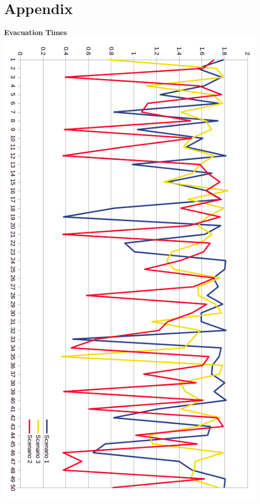 \documentclass[12pt,letterpaper]{article}
\begin{document}
        \section{Appendix}
        \begin{center}
            \textbf{Evacuation Times} \\
            \includegraphics[scale=0.6]{images/stats-graph.png}
        \end{center}
\end{document}
